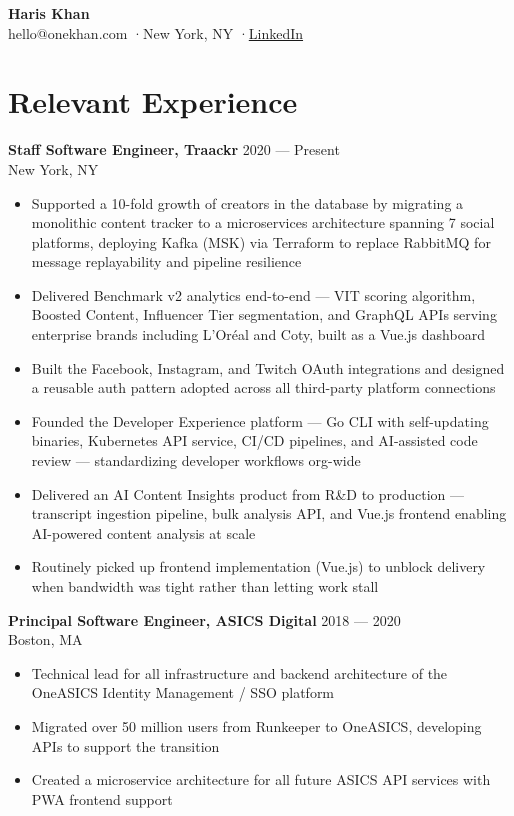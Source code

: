 \documentclass[11pt,letterpaper]{article}
\begin{document}
\begin{center}
  {\fontsize{22}{26}\selectfont\bfseries Haris Khan}\\[4pt]
  {\small\color[HTML]{7A7572} hello@onekhan.com \quad·\quad New York, NY \quad·\quad \href{https://www.linkedin.com/in/tyrantkhan/}{LinkedIn}}
\end{center}

\section{Relevant Experience}

\textbf{Staff Software Engineer, Traackr} \hfill {\small 2020 --- Present}\\
{\small New York, NY}
\begin{itemize}
  \item Supported a 10-fold growth of creators in the database by migrating a monolithic content tracker to a microservices architecture spanning 7 social platforms, deploying Kafka (MSK) via Terraform to replace RabbitMQ for message replayability and pipeline resilience
  \item Delivered Benchmark v2 analytics end-to-end --- VIT scoring algorithm, Boosted Content, Influencer Tier segmentation, and GraphQL APIs serving enterprise brands including L'Or\'{e}al and Coty, built as a Vue.js dashboard
  \item Built the Facebook, Instagram, and Twitch OAuth integrations and designed a reusable auth pattern adopted across all third-party platform connections
  \item Founded the Developer Experience platform --- Go CLI with self-updating binaries, Kubernetes API service, CI/CD pipelines, and AI-assisted code review --- standardizing developer workflows org-wide
  \item Delivered an AI Content Insights product from R\&D to production --- transcript ingestion pipeline, bulk analysis API, and Vue.js frontend enabling AI-powered content analysis at scale
  \item Routinely picked up frontend implementation (Vue.js) to unblock delivery when bandwidth was tight rather than letting work stall
\end{itemize}

\vspace{4pt}
\textbf{Principal Software Engineer, ASICS Digital} \hfill {\small 2018 --- 2020}\\
{\small Boston, MA}
\begin{itemize}
  \item Technical lead for all infrastructure and backend architecture of the OneASICS Identity Management / SSO platform
  \item Migrated over 50 million users from Runkeeper to OneASICS, developing APIs to support the transition
  \item Created a microservice architecture for all future ASICS API services with PWA frontend support
\end{itemize}
\end{document}
